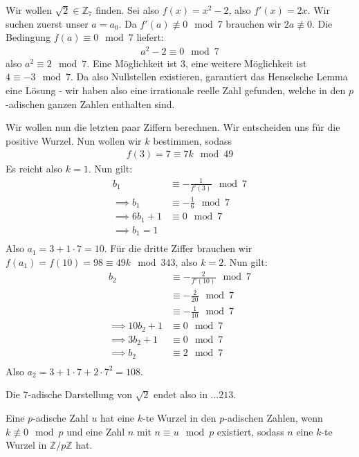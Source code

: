 \documentclass{report}
\newcommand*{\newpar}{\par\vspace{\baselineskip}\noindent}
\newcommand{\bZ}{\mathbb{Z}}
\begin{document}
	\begin{example}
		Wir wollen $\sqrt{2} \in \bZ_7$ finden. Sei also $f(x) = x^2 - 2$, also $f'(x) = 2x$. Wir suchen zuerst unser $a = a_0$. Da $f'(a) \not\equiv 0 \mod 7$ brauchen wir $2a \not\equiv 0$. Die Bedingung $f(a) \equiv 0 \mod 7$ liefert:
		\begin{align*}
			a^2 - 2 \equiv 0 \mod 7
		\end{align*}
		also $a^2 \equiv 2 \mod 7$. Eine Möglichkeit ist $3$, eine weitere Möglichkeit ist $4 \equiv -3 \mod 7$. Da also Nullstellen existieren, garantiert das Henselsche Lemma eine Lösung - wir haben also eine irrationale reelle Zahl gefunden, welche in den $p$-adischen ganzen Zahlen enthalten sind.
		\newpar
		Wir wollen nun die letzten paar Ziffern berechnen. Wir entscheiden uns für die positive Wurzel. Nun wollen wir $k$ bestimmen, sodass
		\begin{align*}
			f(3) = 7 \equiv 7k \mod 49
		\end{align*}
		Es reicht also $k = 1$. Nun gilt:
		\begin{align*}
			b_1 &\equiv -\frac{1}{f'(3)} \mod 7\\
			\implies b_1 &\equiv -\frac{1}{6} \mod 7\\
			\implies 6b_1 + 1 &\equiv 0 \mod 7\\
			\implies b_1 = 1\\
		\end{align*}
		Also $a_1 = 3 + 1 \cdot 7 = 10$.
		Für die dritte Ziffer brauchen wir $f(a_1) = f(10) = 98 \equiv 49k \mod 343$, also $k = 2$. Nun gilt:
		\begin{align*}
			b_2 &\equiv -\frac{2}{f'(10)} \mod 7 \\
				&\equiv -\frac{2}{20} \mod 7 \\
				&\equiv -\frac{1}{10} \mod 7 \\
			\implies 10b_2 + 1 &\equiv 0 \mod 7\\
			\implies 3b_2 + 1 &\equiv 0 \mod 7\\
			\implies b_2 &\equiv 2 \mod 7\\
		\end{align*} 
		Also $a_2 = 3 + 1 \cdot 7 + 2 \cdot 7^2 = 108$.
		\newpar
		Die $7$-adische Darstellung von $\sqrt{2}$ endet also in $\hdots213$.
	\end{example}
	\begin{application}
		Eine $p$-adische Zahl $u$ hat eine $k$-te Wurzel in den $p$-adischen Zahlen, wenn $k \not \equiv 0 \mod p$ und eine Zahl $n$ mit $n \equiv u \mod p$ existiert, sodass $n$ eine $k$-te Wurzel in $\bZ / p\bZ$ hat.
	\end{application}
\end{document}
